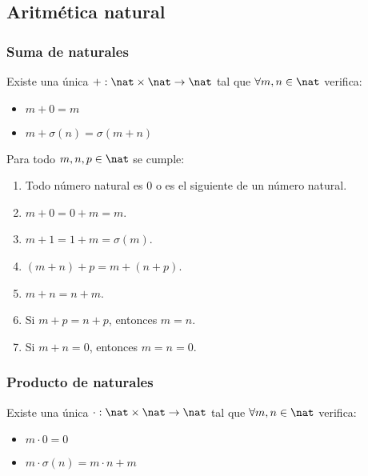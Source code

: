 \subsection{Aritmética natural}
\subsubsection{Suma de naturales}
\begin{nth}
Existe una única $+ : \nat \times \nat \rightarrow \nat$ tal que $\forall m,n \in \nat$ verifica:
\begin{itemize}
\item $m + 0 = m$
\item $m + \sigma(n) = \sigma(m + n)$
\end{itemize}
\end{nth}
\smallskip
\noindent
\begin{properties}
Para todo $m,n,p \in \nat$ se cumple:
\begin{enumerate}
\item Todo número natural es 0 o es el siguiente de un número natural.
\item $m + 0 = 0 + m = m$.
\item $m + 1 = 1 + m = \sigma(m)$.
\item $(m + n) + p = m + (n + p)$.
\item $m + n = n + m$.
\item Si $m + p = n + p$, entonces $m = n$.
\item Si $m + n = 0$, entonces $m = n = 0$.
\end{enumerate}
\end{properties}

\subsubsection{Producto de naturales}
\begin{nth}
Existe una única $\cdot : \nat \times \nat \rightarrow \nat$ tal que $\forall m,n \in \nat$ verifica:
\begin{itemize}
\item $m \cdot 0 = 0$
\item $m \cdot \sigma(n) =  m \cdot n + m$
\end{itemize}
\end{nth}